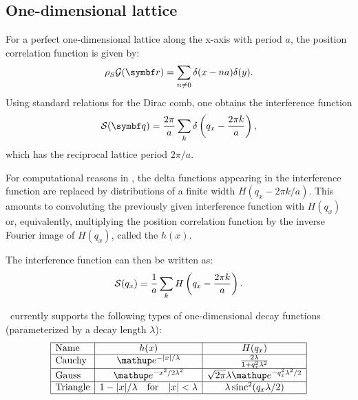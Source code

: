 \subsection{One-dimensional lattice} \label{sec:sect:1dlattice}

For a perfect one-dimensional lattice along the x-axis with period $a$, the position
correlation function is given by:
\begin{equation}
  \rho_S\GD(\r) = \sum_{n\neq 0} \delta(x-na)\delta(y).
\end{equation}
Using standard relations for the Dirac comb,
one obtains the interference function
\begin{equation}
 \SD(\q) = \frac{2\pi}{a}\sum_k \delta\left(q_x - \frac{2\pi k}{a}\right),
\end{equation}
which has the reciprocal lattice period $2\pi/a$.

For computational reasons in \BornAgain, the delta functions appearing in the interference function
are replaced by distributions of a finite width $H(q_x-2\pi k/a)$. This amounts to convoluting the
previously given interference function with $H(q_x)$ or, equivalently, multiplying
the position correlation function by the inverse Fourier image of $H(q_x)$, called the
 $h(x)$.

The interference function can then be written as:
\begin{equation}
  \mathcal{S}(q_x) = \frac{1}{a}\sum_k H\left(q_x - \frac{2\pi k}{a}\right).
\end{equation}

\BornAgain\ currently supports the following types of one-dimensional decay functions
(parameterized by a decay length $\lambda$):
\begin{equation}
  \begin{array}{|l|c|c|}
    \hline
    \text{Name} & h(x) & H(q_x) \\
    \hline
    \text{Cauchy} & \e^{-|x|/\lambda} & \frac{2\lambda}{1+q_x^2\lambda^2} \\
    \hline
    \text{Gauss} & \e^{-x^2/2\lambda^2} & \sqrt{2\pi}\lambda \e^{-q_x^2\lambda^2/2} \\
    \hline
    \text{Triangle} & 1-|x|/\lambda \quad \text{for} \quad |x|<\lambda & \lambda \sinc^2(q_x\lambda/2) \\
    \hline
  \end{array}
\end{equation}

